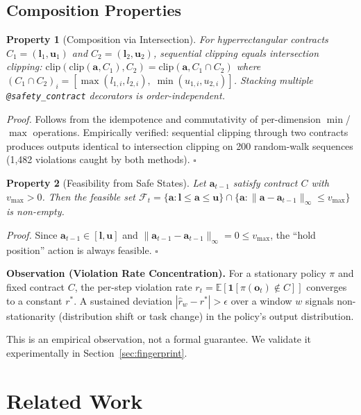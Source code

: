 \documentclass[conference]{IEEEtran}
\newtheorem{property}{Property}
\begin{document}
\subsection{Composition Properties}

\begin{property}[Composition via Intersection]
\label{prop:composition}
For hyperrectangular contracts $C_1 = (\mathbf{l}_1, \mathbf{u}_1)$ and $C_2 = (\mathbf{l}_2, \mathbf{u}_2)$, sequential clipping equals intersection clipping:
$\text{clip}(\text{clip}(\mathbf{a}, C_1), C_2) = \text{clip}(\mathbf{a}, C_1 \cap C_2)$
where $(C_1 \cap C_2)_i = [\max(l_{1,i}, l_{2,i}),\; \min(u_{1,i}, u_{2,i})]$.
Stacking multiple \texttt{@safety\_contract} decorators is order-independent.
\end{property}

\textit{Proof.} Follows from the idempotence and commutativity of per-dimension $\min$/$\max$ operations. Empirically verified: sequential clipping through two contracts produces outputs identical to intersection clipping on 200 random-walk sequences (1{,}482 violations caught by both methods). \hfill $\square$

\begin{property}[Feasibility from Safe States]
\label{prop:deadlock}
Let $\mathbf{a}_{t-1}$ satisfy contract $C$ with $v_{\max} > 0$. Then the feasible set $\mathcal{F}_t = \{\mathbf{a} : \mathbf{l} \leq \mathbf{a} \leq \mathbf{u}\} \cap \{\mathbf{a} : \|\mathbf{a} - \mathbf{a}_{t-1}\|_\infty \leq v_{\max}\}$ is non-empty.
\end{property}

\textit{Proof.} Since $\mathbf{a}_{t-1} \in [\mathbf{l}, \mathbf{u}]$ and $\|\mathbf{a}_{t-1} - \mathbf{a}_{t-1}\|_\infty = 0 \leq v_{\max}$, the ``hold position'' action is always feasible. \hfill $\square$

\noindent\textbf{Observation (Violation Rate Concentration).}
\label{prop:shift}
For a stationary policy $\pi$ and fixed contract $C$, the per-step violation rate $r_t = \mathbb{E}[\mathbf{1}[\pi(\mathbf{o}_t) \notin C]]$ converges to a constant $r^*$. A sustained deviation $|\hat{r}_w - r^*| > \epsilon$ over a window $w$ signals non-stationarity (distribution shift or task change) in the policy's output distribution.


This is an empirical observation, not a formal guarantee. We validate it experimentally in Section~\ref{sec:fingerprint}.

\section{Related Work}
\end{document}
